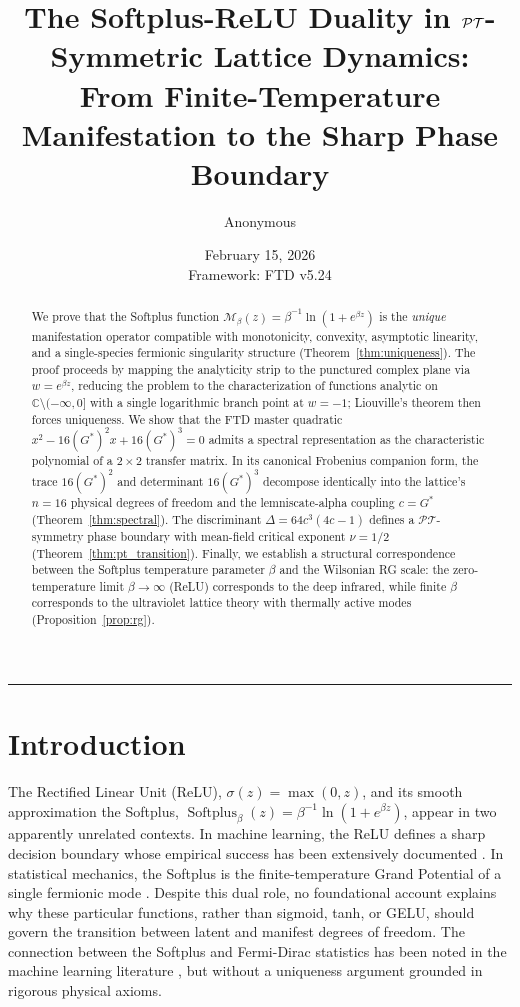 \documentclass[12pt]{article}
\title{\vspace{-3em}\textbf{The Softplus-ReLU Duality in $\PT$-Symmetric Lattice Dynamics:\\ \large From Finite-Temperature Manifestation to the Sharp Phase Boundary}}
\author[1]{Anonymous}
\affil[1]{\textit{Foundational Ternary Dynamics Research}}
\date{February 15, 2026 \\ \vspace{0.5em} \small Framework: FTD v5.24}
\newcommand{\C}{\mathbb{C}}
\newcommand{\PT}{\mathcal{PT}}
\newcommand{\Man}{\mathcal{M}}
\DeclareMathOperator{\Sp}{Softplus}
\theoremstyle{definition}
\theoremstyle{remark}
\begin{document}
\maketitle

\begin{abstract}
We prove that the Softplus function $\Man_\beta(z) = \beta^{-1}\ln(1 + e^{\beta z})$ is the \emph{unique} manifestation operator compatible with monotonicity, convexity, asymptotic linearity, and a single-species fermionic singularity structure (Theorem~\ref{thm:uniqueness}). The proof proceeds by mapping the analyticity strip to the punctured complex plane via $w = e^{\beta z}$, reducing the problem to the characterization of functions analytic on $\C \setminus (-\infty, 0]$ with a single logarithmic branch point at $w = -1$; Liouville's theorem then forces uniqueness. We show that the FTD master quadratic $x^2 - 16(G^{*})^2 x + 16(G^{*})^3 = 0$ admits a spectral representation as the characteristic polynomial of a $2 \times 2$ transfer matrix. In its canonical Frobenius companion form, the trace $16(G^{*})^2$ and determinant $16(G^{*})^3$ decompose identically into the lattice's $n = 16$ physical degrees of freedom and the lemniscate-alpha coupling $c = G^{*}$ (Theorem~\ref{thm:spectral}). The discriminant $\Delta = 64c^3(4c - 1)$ defines a $\PT$-symmetry phase boundary with mean-field critical exponent $\nu = 1/2$ (Theorem~\ref{thm:pt_transition}). Finally, we establish a structural correspondence between the Softplus temperature parameter $\beta$ and the Wilsonian RG scale: the zero-temperature limit $\beta \to \infty$ (ReLU) corresponds to the deep infrared, while finite $\beta$ corresponds to the ultraviolet lattice theory with thermally active modes (Proposition~\ref{prop:rg}).
\end{abstract}

\vspace{1em}
\hrule
\vspace{1.5em}

\section{Introduction}

The Rectified Linear Unit (ReLU), $\sigma(z) = \max(0, z)$, and its smooth approximation the Softplus, $\Sp_\beta(z) = \beta^{-1}\ln(1 + e^{\beta z})$, appear in two apparently unrelated contexts. In machine learning, the ReLU defines a sharp decision boundary whose empirical success has been extensively documented \cite{Glorot2011}. In statistical mechanics, the Softplus is the finite-temperature Grand Potential of a single fermionic mode \cite{Landau1980}. Despite this dual role, no foundational account explains why these particular functions, rather than sigmoid, tanh, or GELU, should govern the transition between latent and manifest degrees of freedom. The connection between the Softplus and Fermi-Dirac statistics has been noted in the machine learning literature \cite{Dugas2001}, but without a uniqueness argument grounded in rigorous physical axioms.
\end{document}
